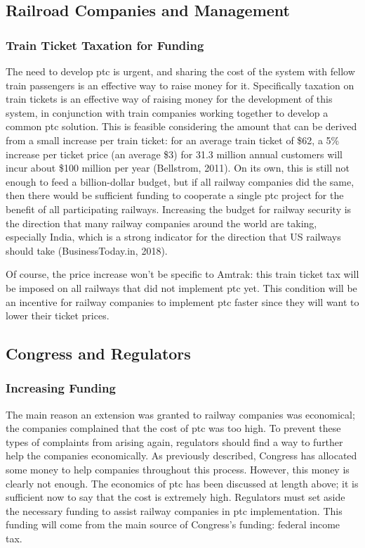 \documentclass[11pt, titlepage]{article}
\begin{document}
\subsection{Railroad Companies and Management}

\subsubsection{Train Ticket Taxation for Funding}

The need to develop \gls{ptc} is urgent, and sharing the cost of the system with
fellow train passengers is an effective way to raise money for it. Specifically
taxation on train tickets is an effective way of raising money for the development
of this system, in conjunction with train companies working together to develop a
common \gls{ptc} solution. This is feasible considering the amount that can be
derived from a small increase per train ticket: for an average train ticket of \$62,
a 5\% increase per ticket price (an average \$3) for 31.3 million annual customers
will incur about \$100 million per year (Bellstrom, 2011). On its own, this is still
not enough to feed a billion-dollar budget, but if all railway companies did the
same, then there would be sufficient funding to cooperate a single \gls{ptc} project
for the benefit of all participating railways. Increasing the budget for railway
security is the direction that many railway companies around the world are taking,
especially India, which is a strong indicator for the direction that US railways
should take (BusinessToday.in, 2018).

Of course, the price increase won’t be specific to Amtrak: this train ticket tax
will be imposed on all railways that did not implement \gls{ptc} yet. This condition
will be an incentive for railway companies to implement \gls{ptc} faster since they
will want to lower their ticket prices.

\subsection{Congress and Regulators}

\subsubsection{Increasing Funding}

The main reason an extension was granted to railway companies was economical; the
companies complained that the cost of \gls{ptc} was too high. To prevent these types
of complaints from arising again, regulators should find a way to further help the
companies economically. As previously described, Congress has allocated some money
to help companies throughout this process. However, this money is clearly not
enough. The economics of \gls{ptc} has been discussed at length above; it is
sufficient now to say that the cost is extremely high. Regulators must set aside the
necessary funding to assist railway companies in \gls{ptc} implementation. This
funding will come from the main source of Congress’s funding: federal income tax.
\end{document}
